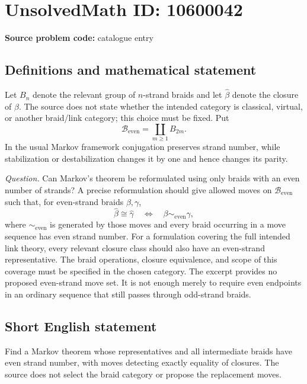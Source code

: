 \documentclass[11pt]{article}
\begin{document}
\section*{UnsolvedMath ID: 10600042}
\textbf{Source problem code:} catalogue entry
\subsection{Definitions and mathematical statement}
Let \(B_n\) denote the relevant group of \(n\)-strand braids and let \(\widehat\beta\) denote the closure of \(\beta\). The source does not state whether the intended category is classical, virtual, or another braid/link category; this choice must be fixed. Put
\[
 \mathcal B_{\mathrm{even}}=\coprod_{m\geq1}B_{2m}.
\]
In the usual Markov framework conjugation preserves strand number, while stabilization or destabilization changes it by one and hence changes its parity.

\emph{Question.} Can Markov's theorem be reformulated using only braids with an even number of strands? A precise reformulation should give allowed moves on \(\mathcal B_{\mathrm{even}}\) such that, for even-strand braids \(\beta,\gamma\),
\[
 \widehat\beta\cong\widehat\gamma
 \quad\Longleftrightarrow\quad
 \beta\sim_{\mathrm{even}}\gamma,
\]
where \(\sim_{\mathrm{even}}\) is generated by those moves and every braid occurring in a move sequence has even strand number. For a formulation covering the full intended link theory, every relevant closure class should also have an even-strand representative. The braid operations, closure equivalence, and scope of this coverage must be specified in the chosen category. The excerpt provides no proposed even-strand move set. It is not enough merely to require even endpoints in an ordinary sequence that still passes through odd-strand braids.
\subsection{Short English statement}
Find a Markov theorem whose representatives and all intermediate braids have even strand number, with moves detecting exactly equality of closures. The source does not select the braid category or propose the replacement moves.
\end{document}
